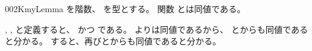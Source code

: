 \documentclass[index]{subfiles}
\begin{document}
\begin{myBlock}{002K}{myLemma}
  を階数、
  を型とする。
  関数
  とは同値である。
\end{myBlock}
\begin{myProof}
  ,
  ,
  と定義すると、
  かつ
  である。
  よりは同値であるから、
  とからも同値であると分かる。
  すると、再びとからも同値であると分かる。
\end{myProof}
\end{document}
